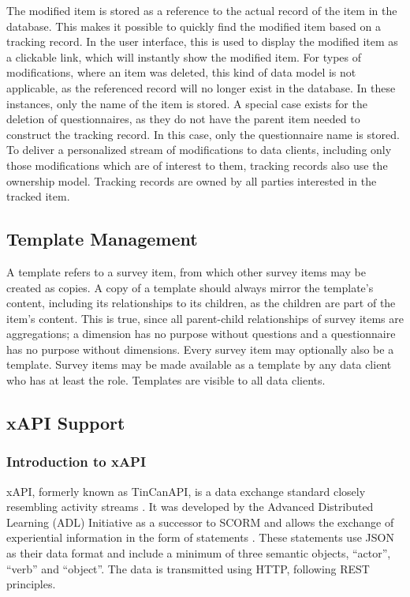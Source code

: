     The modified item is stored as a reference to the actual record of the item in the database.
    This makes it possible to quickly find the modified item based on
    a tracking record. In the user interface, this is used to display the
    modified item as a clickable link, which will instantly show the modified item.
    For types of modifications, where an item was deleted, this 
    kind of data model is not applicable, as the referenced record will no longer 
    exist in the database. In these instances, only the name of
    the item is stored. A special case exists for the deletion of questionnaires,
    as they do not have the parent item needed to construct the tracking record.
    In this case, only the questionnaire name is stored.
    To deliver a personalized stream of modifications to data clients,
    including only those modifications which are of interest to them,
    tracking records also use the ownership model.
    Tracking records are owned by all parties interested in the tracked
    item.

\subsection{Template Management}
\label{concept:template-management}
    A template refers to a survey item, from which other survey items
    may be created as copies. A copy of a template should always
    mirror the template's content, including its relationships
    to its children, as the children are part of the item's content.
    This is true, since all parent-child relationships 
    of survey items are aggregations; a dimension has no purpose
    without questions and a questionnaire has no purpose
    without dimensions. Every survey item may optionally also
    be a template. Survey items may be made available as a template by 
    any data client who has at least the  role.
    Templates are visible to all data clients.


\subsection{xAPI Support}
    \subsubsection{Introduction to xAPI}
        xAPI, formerly known as TinCanAPI, is a data exchange
        standard closely resembling activity streams \cite{activity-streams}.
        It was developed by the Advanced Distributed Learning (ADL) Initiative
        as a successor to SCORM \cite{scorm,xapi-history} and allows the exchange of experiential
        information in the form of statements \cite{xapi-object-model}. These statements
        use JSON as their data format and include a minimum of three
        semantic objects, ``actor'', ``verb'' and ``object''. 
        The data is transmitted using HTTP, following REST principles.

